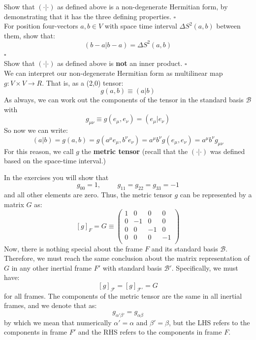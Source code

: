 \documentclass[12pt]{article}
\begin{document}
\exercise
Show that $(\cdot|\cdot)$ as defined above is a
non-degenerate Hermitian form, by demonstrating that it has the three
defining properties.  $\square$ \\[3pt]

\exercise
For position four-vectors $a,b \in V$ with space time interval $\Delta S^2(a,b)$ between them, show that:
$$(b-a|b-a) = \Delta S^2(a,b)$$
 $\square$ \\[3pt]

\exercise
Show that $(\cdot|\cdot)$ as defined above is {\bf not} an inner product.
 $\square$ \\[3pt]

\noindent
We can interpret our non-degenerate Hermitian form as multilinear
map $g: V\times V \to R$.  That is, as a (2,0) tensor:
$$g(a,b) \equiv (a | b)$$
As always, we can work out the components of the tensor in the standard basis $\mathcal{B}$ with
\begin{equation}
\label{eqn:metrictensor}
g_{\mu\nu} \equiv g(e_\mu, e_\nu) = (e_\mu | e_\nu)
\end{equation}
So now we can write:
$$(a|b) = g(a,b) = g(a^\mu e_\mu, b^\nu e_\nu) =  a^\mu b^\nu g(e_\mu, e_\nu) = a^\mu b^\nu g_{\mu\nu} $$
For this reason, we call $g$ the {\bf metric tensor} (recall that the
$(\cdot|\cdot)$ was defined based on the space-time interval.)

In the exercises you will show that
\begin{equation}
  \label{eqn:metric-components}
  g_{00}=1, \hspace{1cm} g_{11} = g_{22} = g_{33} = -1
\end{equation}
and all other elements are zero.  Thus, the metric tensor $g$ can be represented by a matrix $G$ as:
\begin{equation}
\label{eqn:metric-matrix}
[g]_F = G \equiv
\begin{pmatrix}
1 &  0 &  0 &  0 \\
0 & -1 &  0 &  0 \\
0 &  0 & -1 &  0 \\
0 &  0 &  0 & -1 \\
\end{pmatrix}
\end{equation}
Now, there is nothing special about the frame $F$ and its standard
basis $\mathcal{B}$.  Therefore, we must reach the same conclusion
about the matrix representation of $G$ in any other inertial frame
$F'$ with standard basis $\mathcal{B}'$.  Specifically, we must have:
$$
[g]_\mathcal{F} = [g]_{\mathcal{F}'} = G
$$
for all frames.  The components of the metric tensor are the same in
all inertial frames, and we denote that as:
\begin{equation}
\label{eqn:invariant-tensor}
g_{\alpha'\beta'} = g_{\alpha\beta}
\end{equation}
by which we mean that numerically $\alpha'=\alpha$ and $\beta'=\beta$,
but the LHS refers to the components in frame $F'$ and the RHS refers
to the components in frame $F$.\\[5pt]
\end{document}
